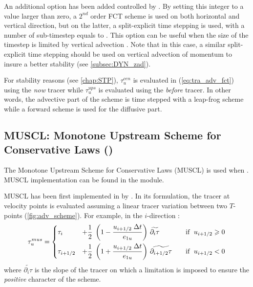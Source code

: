 \documentclass[../tex_main/NEMO_manual]{subfiles}
\begin{document}
An additional option has been added controlled by .
By setting this integer to a value larger than zero,
a $2^{nd}$ order FCT scheme is used on both horizontal and vertical direction, but on the latter,
a split-explicit time stepping is used, with a number of sub-timestep equals to .
This option can be useful when the size of the timestep is limited by vertical advection \citep{Lemarie_OM2015}.
Note that in this case, a similar split-explicit time stepping should be used on vertical advection of momentum to
insure a better stability (see \autoref{subsec:DYN_zad}).

For stability reasons (see \autoref{chap:STP}),
$\tau _u^{cen}$ is evaluated in (\autoref{eq:tra_adv_fct}) using the \textit{now} tracer while
$\tau _u^{ups}$ is evaluated using the \textit{before} tracer.
In other words, the advective part of the scheme is time stepped with a leap-frog scheme
while a forward scheme is used for the diffusive part. 

\subsection{MUSCL: Monotone Upstream Scheme for Conservative Laws (\protect{})}
\label{subsec:TRA_adv_mus}

The Monotone Upstream Scheme for Conservative Laws (MUSCL) is used when .
MUSCL implementation can be found in the  module.

MUSCL has been first implemented in \NEMO by \citet{Levy_al_GRL01}.
In its formulation, the tracer at velocity points is evaluated assuming a linear tracer variation between
two $T$-points (\autoref{fig:adv_scheme}).
For example, in the $i$-direction :
\begin{equation} \label{eq:tra_adv_mus}
   \tau _u^{mus} = \left\{      \begin{aligned}
         &\tau _i  &+ \frac{1}{2} \;\left( 1-\frac{u_{i+1/2} \;\Delta t}{e_{1u}} \right)
         &\ \widetilde{\partial _i \tau}  & \quad \text{if }\;u_{i+1/2} \geqslant 0      \\
         &\tau _{i+1/2} &+\frac{1}{2}\;\left( 1+\frac{u_{i+1/2} \;\Delta t}{e_{1u} } \right)
         &\ \widetilde{\partial_{i+1/2} \tau } & \text{if }\;u_{i+1/2} <0
   \end{aligned}    \right.
\end{equation}
where $\widetilde{\partial _i \tau}$ is the slope of the tracer on which a limitation is imposed to
ensure the \textit{positive} character of the scheme.
\end{document}
